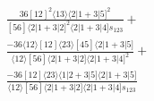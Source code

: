 \documentclass[varwidth, border=5pt]{standalone}
\begin{document}
\begin{my}
$\begin{gathered}
\scriptscriptstyle\frac{36[12]^2⟨13⟩⟨2|1+3|5]^2}{[56]⟨2|1+3|2]^2⟨2|1+3|4]s_{123}}+\\
\scriptscriptstyle\frac{-36⟨12⟩[12]⟨23⟩[45]⟨2|1+3|5]}{⟨12⟩[56]⟨2|1+3|2]⟨2|1+3|4]^2}+\\
\scriptscriptstyle\frac{-36[12]⟨23⟩⟨1|2+3|5]⟨2|1+3|5]}{⟨12⟩[56]⟨2|1+3|2]⟨2|1+3|4]s_{123}}\phantom{+}
\end{gathered}$
\end{my}
\end{document}
